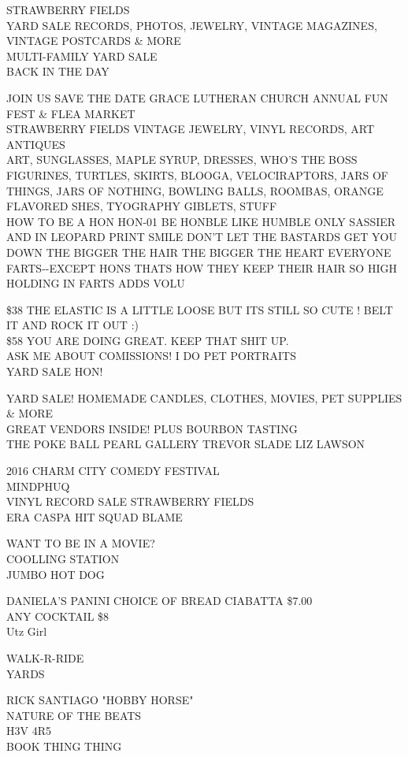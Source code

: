 \documentclass[10pt,letterpaper]{article}
\begin{document}
STRAWBERRY FIELDS\\
YARD SALE RECORDS, PHOTOS, JEWELRY, VINTAGE MAGAZINES, VINTAGE POSTCARDS \& MORE\\
MULTI{-}FAMILY YARD SALE\\
BACK IN THE DAY

JOIN US SAVE THE DATE GRACE LUTHERAN CHURCH ANNUAL FUN FEST \& FLEA MARKET\\
STRAWBERRY FIELDS VINTAGE JEWELRY, VINYL RECORDS, ART ANTIQUES\\
ART, SUNGLASSES, MAPLE SYRUP, DRESSES, WHO'S THE BOSS FIGURINES, TURTLES, SKIRTS, BLOOGA, VELOCIRAPTORS, JARS OF THINGS, JARS OF NOTHING, BOWLING BALLS, ROOMBAS, ORANGE FLAVORED SHES, TYOGRAPHY GIBLETS, STUFF\\
HOW TO BE A HON HON{-}01 BE HONBLE LIKE HUMBLE ONLY SASSIER AND IN LEOPARD PRINT SMILE DON'T LET THE BASTARDS GET YOU DOWN THE BIGGER THE HAIR THE BIGGER THE HEART EVERYONE FARTS{-}{-}EXCEPT HONS THATS HOW THEY KEEP THEIR HAIR SO HIGH HOLDING IN FARTS ADDS VOLU

\$38 THE ELASTIC IS A LITTLE LOOSE BUT ITS STILL SO CUTE !  BELT IT AND ROCK IT OUT :)\\
\$58 YOU ARE DOING GREAT.  KEEP THAT SHIT UP.\\
ASK ME ABOUT COMISSIONS!  I DO PET PORTRAITS\\
YARD SALE HON!

YARD SALE!  HOMEMADE CANDLES, CLOTHES, MOVIES, PET SUPPLIES \& MORE\\
GREAT VENDORS INSIDE!  PLUS BOURBON TASTING\\
THE POKE BALL PEARL GALLERY TREVOR SLADE LIZ LAWSON

2016 CHARM CITY COMEDY FESTIVAL\\
MINDPHUQ\\
VINYL RECORD SALE STRAWBERRY FIELDS\\
ERA CASPA HIT SQUAD BLAME

WANT TO BE IN A MOVIE?\\
COOLLING STATION\\
JUMBO HOT DOG

DANIELA'S PANINI CHOICE OF BREAD CIABATTA \$7.00\\
ANY COCKTAIL \$8\\
Utz Girl

WALK{-}R{-}RIDE\\
YARDS

RICK SANTIAGO "HOBBY HORSE"\\
NATURE OF THE BEATS\\
H3V 4R5\\
BOOK THING THING
\end{document}
